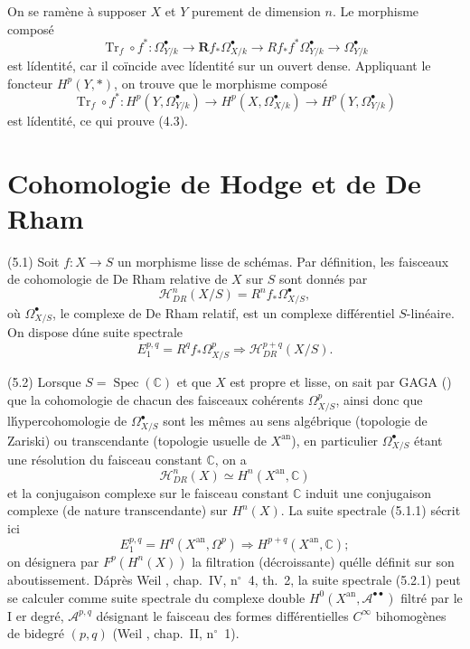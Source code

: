 \documentclass[12pt]{amsart}
\theoremstyle{plain}
\theoremstyle{remark}
\DeclareMathOperator{\Spec}{Spec}
\DeclareMathOperator{\Tr}{Tr}
\newcommand{\cH}{\mathscr{H}}
\newcommand{\Rf}{\mathbf{R}f_*}
\begin{document}
On se ram\`ene \`a supposer $X$ et $Y$ purement de dimension $n$. Le morphisme compos\'e
\[
\Tr_f \circ f^* : \Omega_{Y/k}^\bullet \longrightarrow \Rf \Omega_{X/k}^\bullet \longrightarrow R f_* f^* \Omega_{Y/k}^\bullet \longrightarrow \Omega_{Y/k}^\bullet
\]
est l\'identit\'e, car il co\"incide avec l\'identit\'e sur un ouvert dense. Appliquant le foncteur $H^p(Y, *)$, on trouve que le morphisme compos\'e
\[
\Tr_f \circ f^* : H^p(Y, \Omega_{Y/k}^\bullet) \longrightarrow H^p(X, \Omega_{X/k}^\bullet) \longrightarrow H^p(Y, \Omega_{Y/k}^\bullet)
\]
est l\'identit\'e, ce qui prouve (4.3).

\section{Cohomologie de Hodge et de De Rham}

(5.1) Soit $f : X \to S$ un morphisme lisse de sch\'emas. Par d\'efinition, les faisceaux de cohomologie de De Rham relative de $X$ sur $S$ sont donn\'es par
\[
\cH_{DR}^n(X/S) = R^n f_* \Omega_{X/S}^\bullet,
\]
o\`u $\Omega_{X/S}^\bullet$, le complexe de De Rham relatif, est un complexe diff\'erentiel $S$-lin\'eaire. On dispose d\'une suite spectrale
\begin{equation}\label{eq:5.1.1}
E_1^{p,q} = R^q f_* \Omega_{X/S}^p \Rightarrow \cH_{DR}^{p+q}(X/S).
\end{equation}

(5.2) Lorsque $S = \Spec(\mathbb{C})$ et que $X$ est propre et lisse, on sait par GAGA (\cite{Serre}) que la cohomologie de chacun des faisceaux coh\'erents $\Omega_{X/S}^p$, ainsi donc que l\'hypercohomologie de $\Omega_{X/S}^\bullet$ sont les m\^emes au sens alg\'ebrique (topologie de Zariski) ou transcendante (topologie usuelle de $X^{\text{an}}$), en particulier $\Omega_{X/S}^\bullet$ \'etant une r\'esolution du faisceau constant $\mathbb{C}$, on a
\[
\cH_{DR}^n(X) \simeq H^n(X^{\text{an}}, \mathbb{C})
\]
et la conjugaison complexe sur le faisceau constant $\mathbb{C}$ induit une conjugaison complexe (de nature transcendante) sur $H^n(X)$. La suite spectrale (5.1.1) s\'ecrit ici
\begin{equation}\label{eq:5.2.1}
E_1^{p,q} = H^q(X^{\text{an}}, \Omega^p) \Rightarrow H^{p+q}(X^{\text{an}}, \mathbb{C});
\end{equation}
on d\'esignera par $F^p(H^n(X))$ la filtration (d\'ecroissante) qu\'elle d\'efinit sur son aboutissement. D\'apr\`es Weil \cite{Weil1}, chap.~IV, n${}^\circ$~4, th.~2, la suite spectrale (5.2.1) peut se calculer comme suite spectrale du complexe double $H^0(X^{\text{an}}, \mathscr{A}^{\bullet\bullet})$ filtr\'e par le I er degr\'e, $\mathscr{A}^{p,q}$ d\'esignant le faisceau des formes diff\'erentielles $C^\infty$ bihomog\`enes de bidegr\'e $(p, q)$ (Weil \cite{Weil1}, chap.~II, n${}^\circ$~1).
\end{document}
